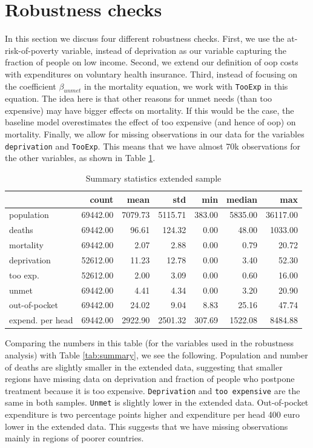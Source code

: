 \documentclass[a4paper,12pt]{article}
\begin{document}
\section{Robustness checks}
\label{sec:org6c9aaf6}

In this section we discuss four different robustness checks. First, we use the at-risk-of-poverty variable, instead of deprivation as our variable capturing the fraction of people on low income. Second, we extend our definition of oop costs with expenditures on voluntary health insurance. Third, instead of focusing on the coefficient \(\beta_{unmet}\) in the mortality equation, we work with \texttt{TooExp} in this equation. The idea here is that other reasons for unmet needs (than too expensive) may have bigger effects on mortality. If this would be the case, the baseline model overestimates the effect of too expensive (and hence of oop) on mortality. Finally, we allow for missing observations in our data for the variables \texttt{deprivation} and \texttt{TooExp}. This means that we have almost 70k observations for the other variables, as shown in Table \ref{tab:summary_extended_data}.

\begin{table}[htbp]
\caption{\label{tab:summary_extended_data}Summary statistics extended sample}
\centering
\begin{tabular}{lrrrrrr}
 & count & mean & std & min & median & max\\
\hline
population & 69442.00 & 7079.73 & 5115.71 & 383.00 & 5835.00 & 36117.00\\
deaths & 69442.00 & 96.61 & 124.32 & 0.00 & 48.00 & 1033.00\\
mortality & 69442.00 & 2.07 & 2.88 & 0.00 & 0.79 & 20.72\\
deprivation & 52612.00 & 11.23 & 12.78 & 0.00 & 3.40 & 52.30\\
too exp. & 52612.00 & 2.00 & 3.09 & 0.00 & 0.60 & 16.00\\
unmet & 69442.00 & 4.41 & 4.34 & 0.00 & 3.20 & 20.90\\
out-of-pocket & 69442.00 & 24.02 & 9.04 & 8.83 & 25.16 & 47.74\\
expend. per head & 69442.00 & 2922.90 & 2501.32 & 307.69 & 1522.08 & 8484.88\\
\end{tabular}
\end{table}

Comparing the numbers in this table (for the variables used in the robustness analysis) with Table \ref{tab:summary}, we see the following. Population and number of deaths are slightly smaller in the extended data, suggesting that smaller regions have missing data on deprivation and fraction of people who postpone treatment because it is too expensive. \texttt{Deprivation} and \texttt{too expensive} are the same in both samples. \texttt{Unmet} is slightly lower in the extended data. Out-of-pocket expenditure is two percentage points higher and expenditure per head 400 euro lower in the extended data. This suggests that we have missing observations mainly in regions of poorer countries. 
\end{document}
